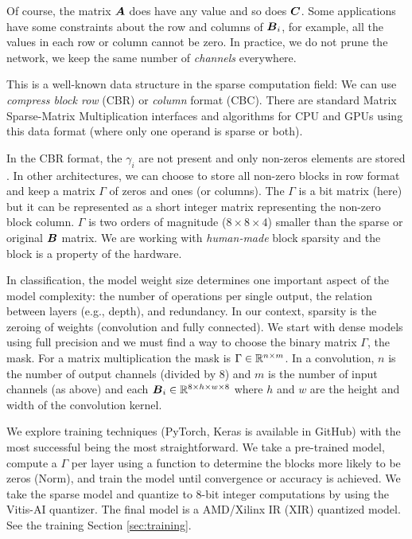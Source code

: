 \documentclass[conference]{IEEEtran}
\begin{document}
Of course, the matrix ${\boldsymbol A}$ does have any value and so does
${\boldsymbol C}$. Some applications have some constraints about the row and
columns of ${\boldsymbol B}_i$, for example, all the values in each row or
column cannot be zero. In practice, we do not prune the network, we
keep the same number of {\em channels} everywhere.

This is a well-known data structure in the sparse computation field:
We can use {\em compress block row} (CBR) or {\em column} format
(CBC). There are standard Matrix Sparse-Matrix Multiplication
interfaces and algorithms for CPU and GPUs using this data format
(where only one operand is sparse or both).

In the CBR format, the $\gamma_i$ are not present and only non-zeros
elements are stored \cite{rocSPARSE,cuSPARSE}. In other architectures,
we can choose to store all non-zero blocks in row format and keep a
matrix $\Gamma$ of zeros and ones (or columns). The $\Gamma$ is a bit
matrix (here) but it can be represented as a short integer matrix
representing the non-zero block column. $\Gamma$ is two orders of
magnitude ($8\times 8 \times 4$) smaller than the sparse or original
${\boldsymbol B}$ matrix. We are working with {\em human-made} block sparsity
and the block is a property of the hardware.

In classification, the model weight size determines one important
aspect of the model complexity: the number of operations per single
output, the relation between layers (e.g., depth), and redundancy.  In
our context, sparsity is the zeroing of weights (convolution and fully
connected). We start with dense models using full precision and we
must find a way to choose the binary matrix $\Gamma$, the mask. For a
matrix multiplication the mask is $\Gamma \in \mathbb{R}^{n\times m}$. In a
convolution, $n$ is the number of output channels (divided by 8) and
$m$ is the number of input channels (as above) and each ${\boldsymbol B}_i \in
\mathbb{R}^{8\times h \times w \times 8}$ where $h$ and $w$ are the height and
width of the convolution kernel.


We explore training techniques (PyTorch, Keras is available in GitHub)
with the most successful being the most straightforward. We take a
pre-trained model, compute a $\Gamma$ per layer using a function to
determine the blocks more likely to be zeros (Norm), and train the
model until convergence or accuracy is achieved. We take the sparse
model and quantize to 8-bit integer computations by using the Vitis-AI
quantizer. The final model is a AMD/Xilinx IR (XIR) quantized
model. See the training Section \ref{sec:training}.
\end{document}
